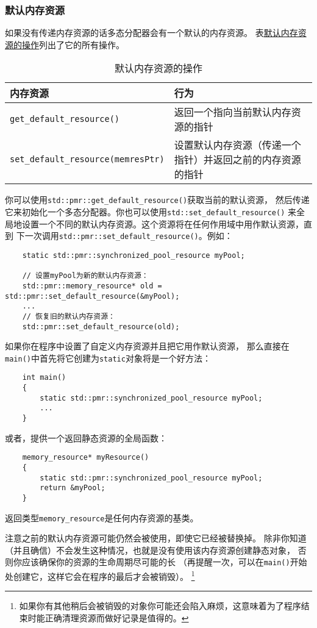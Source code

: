 \subsubsection{默认内存资源}
如果没有传递内存资源的话多态分配器会有一个默认的内存资源。
表\hyperref[t29.2]{默认内存资源的操作}列出了它的所有操作。
\begin{table}[htb]
    \centering
    \begin{tabular}{l|p{}}
        \hline
        \textbf{内存资源}                              & \textbf{行为}                   \\
        \hline
        \texttt{get\_default\_resource()}          & 返回一个指向当前默认内存资源的指针             \\
        \texttt{set\_default\_resource(memresPtr)} & 设置默认内存资源（传递一个指针）并返回之前的内存资源的指针 \\
        \hline
    \end{tabular}
    \caption{默认内存资源的操作}
    \label{t29.2}
\end{table}

你可以使用\texttt{std::pmr::get\_default\_resource()}获取当前的默认资源，
然后传递它来初始化一个多态分配器。你也可以使用\texttt{std::set\_default\_resource()}
来全局地设置一个不同的默认内存资源。这个资源将在任何作用域中用作默认资源，直到
下一次调用\texttt{std::pmr::set\_default\_resource()}。例如：
\begin{lstlisting}
    static std::pmr::synchronized_pool_resource myPool;

    // 设置myPool为新的默认内存资源：
    std::pmr::memory_resource* old = std::pmr::set_default_resource(&myPool);
    ...
    // 恢复旧的默认内存资源：
    std::pmr::set_default_resource(old);
\end{lstlisting}
如果你在程序中设置了自定义内存资源并且把它用作默认资源，
那么直接在\texttt{main()}中首先将它创建为\texttt{static}对象将是一个好方法：
\begin{lstlisting}
    int main()
    {
        static std::pmr::synchronized_pool_resource myPool;
        ...
    }
\end{lstlisting}
或者，提供一个返回静态资源的全局函数：
\begin{lstlisting}
    memory_resource* myResource()
    {
        static std::pmr::synchronized_pool_resource myPool;
        return &myPool;
    }
\end{lstlisting}
返回类型\texttt{memory\_resource}是任何内存资源的基类。

注意之前的默认内存资源可能仍然会被使用，即使它已经被替换掉。
除非你知道（并且确信）不会发生这种情况，也就是没有使用该内存资源创建静态对象，
否则你应该确保你的资源的生命周期尽可能的长
（再提醒一次，可以在\texttt{main()}开始处创建它，这样它会在程序的最后才会被销毁）。
\footnote{如果你有其他稍后会被销毁的对象你可能还会陷入麻烦，这意味着为了程序结束时能正确清理资源而做好记录是值得的。}

